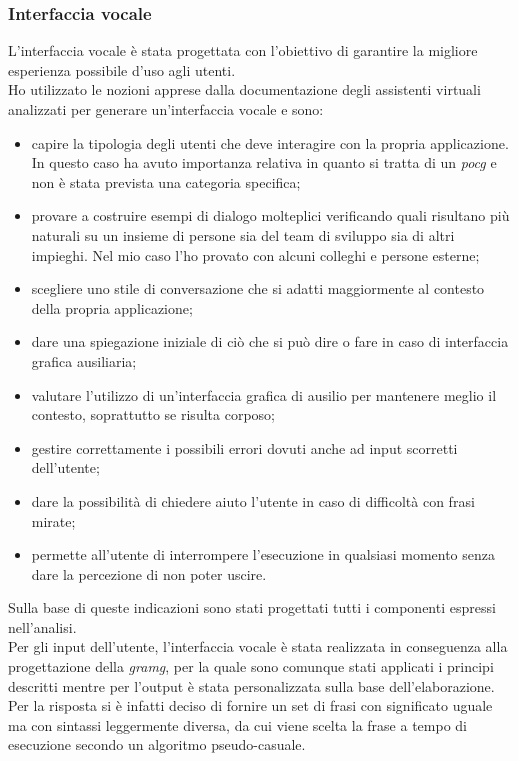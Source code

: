 		\subsubsection{Interfaccia vocale}
		L'interfaccia vocale è stata progettata con l'obiettivo di garantire la migliore esperienza possibile d'uso agli utenti. \\
		Ho utilizzato le nozioni apprese dalla documentazione degli assistenti virtuali analizzati per generare un'interfaccia vocale e sono:
		\begin{itemize}
			\item capire la tipologia degli utenti che deve interagire con la propria applicazione. In questo caso ha avuto importanza relativa in quanto si tratta di un \emph{\gls{pocg}} e non è stata prevista una categoria specifica;
			\item provare a costruire esempi di dialogo molteplici verificando quali risultano più naturali su un insieme di persone sia del team di sviluppo sia di altri impieghi. Nel mio caso l'ho provato con alcuni colleghi e persone esterne;
			\item scegliere uno stile di conversazione che si adatti maggiormente al contesto della propria applicazione;
			\item dare una spiegazione iniziale di ciò che si può dire o fare in caso di interfaccia grafica ausiliaria;
			\item valutare l'utilizzo di un'interfaccia grafica di ausilio per mantenere meglio il contesto, soprattutto se risulta corposo;
			\item gestire correttamente i possibili errori dovuti anche ad input scorretti dell'utente;
			\item dare la possibilità di chiedere aiuto l'utente in caso di difficoltà con frasi mirate;
			\item permette all'utente di interrompere l'esecuzione in qualsiasi momento senza dare la percezione di non poter uscire.
		\end{itemize}		
		Sulla base di queste indicazioni sono stati progettati tutti i componenti espressi nell'analisi. \\
		Per gli input dell'utente, l'interfaccia vocale è stata realizzata in conseguenza alla progettazione della \emph{\gls{gramg}}, per la quale sono comunque stati applicati i principi descritti mentre per l'output è stata personalizzata sulla base dell'elaborazione. Per la risposta si è infatti deciso di fornire un set di frasi con significato uguale ma con sintassi leggermente diversa, da cui viene scelta la frase a tempo di esecuzione secondo un algoritmo pseudo-casuale.
